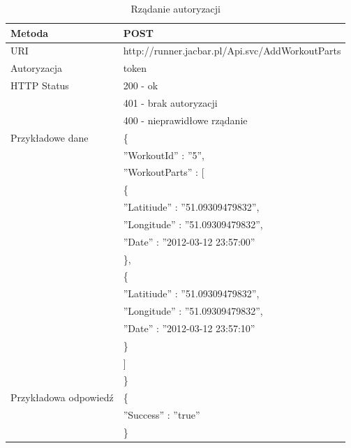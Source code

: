 \begin{table}
 \label{workoutpart}
  \caption{Rządanie autoryzacji}
  \begin{center}
  \begin{tabular}{| l | l |}
  	\hline
  	Metoda & POST \\ \hline
  	URI & http://runner.jacbar.pl/Api.svc/AddWorkoutParts \\ \hline
  	Autoryzacja & token\\ \hline
  	HTTP Status & 200 - ok \\
                & 401 - brak autoryzacji \\
                & 400 - nieprawidłowe rządanie \\ \hline
    Przykładowe dane & \{ \\
    								 & \quad ''WorkoutId'' : ''5'', \\
    								 & \quad ''WorkoutParts'' : [ \\
    								 & \qquad \{ \\
    								 & \quad \qquad ''Latitiude'' : ''51.09309479832'', \\
    								 & \quad \qquad ''Longitude'' : ''51.09309479832'', \\
    								 & \quad \qquad ''Date'' : ''2012-03-12 23:57:00'' \\
    								 & \qquad \}, \\    								 & \qquad \{ \\
    								 & \quad \qquad ''Latitiude'' : ''51.09309479832'', \\
    								 & \quad \qquad ''Longitude'' : ''51.09309479832'', \\
    								 & \quad \qquad ''Date'' : ''2012-03-12 23:57:10'' \\
    								 & \qquad \} \\
    								 & \quad ] \\
    								 & \} \\ \hline
    Przykładowa odpowiedź & \{ \\
                          & \quad ''Success'' : ''true'' \\
                          & \} \\ \hline
  \end{tabular}
  \end{center}
\end{table}

